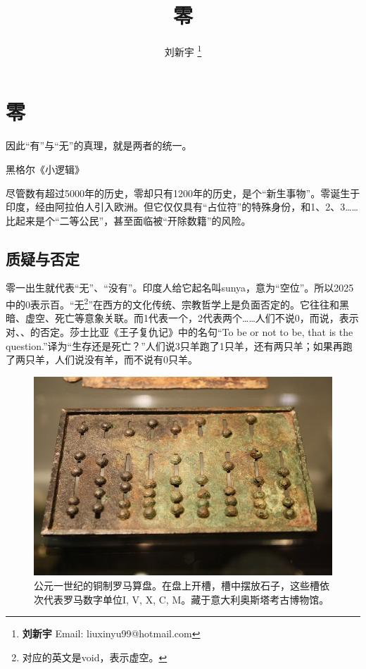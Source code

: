 \documentclass[b5paper]{ctexart}
\begin{document}
\title{零}

\author{刘新宇
\thanks{{\bfseries 刘新宇} \newline
  Email: liuxinyu99@hotmail.com \newline}
  }

\maketitle
\fi


\ifx\wholebook\relax
\chapter{零}
\fi

\epigraph{因此“有”与“无”的真理，就是两者的统一。}{黑格尔《小逻辑》}

尽管数有超过5000年的历史，零却只有1200年的历史，是个“新生事物”。零诞生于印度，经由阿拉伯人引入欧洲。但它仅仅具有“占位符”的特殊身份，和1、2、3……比起来是个“二等公民”，甚至面临被“开除数籍”的风险。

\section{质疑与否定}
零一出生就代表“无”、“没有”。印度人给它起名叫sunya，意为“空位”。所以2025中的0表示百。“无\footnote{对应的英文是void，表示虚空。}”在西方的文化传统、宗教哲学上是负面否定的。它往往和黑暗、虚空、死亡等意象关联。而1代表一个，2代表两个……人们不说0，而说，表示对、、的否定。莎士比亚《王子复仇记》中的名句“To be or not to be, that is the question.”译为“生存还是死亡？”人们说3只羊跑了1只羊，还有两只羊；如果再跑了两只羊，人们说没有羊，而不说有0只羊。

\begin{figure}[htbp]
 \centering
 \includegraphics[scale=0.3]{img/Roman-abacus}
 \caption{公元一世纪的铜制罗马算盘\cite{Cartwright-2013}。在盘上开槽，槽中摆放石子，这些槽依次代表罗马数字单位I, V, X, C, M。藏于意大利奥斯塔考古博物馆。}
 \label{fig:roman-abacus}
\end{figure}
\end{document}
